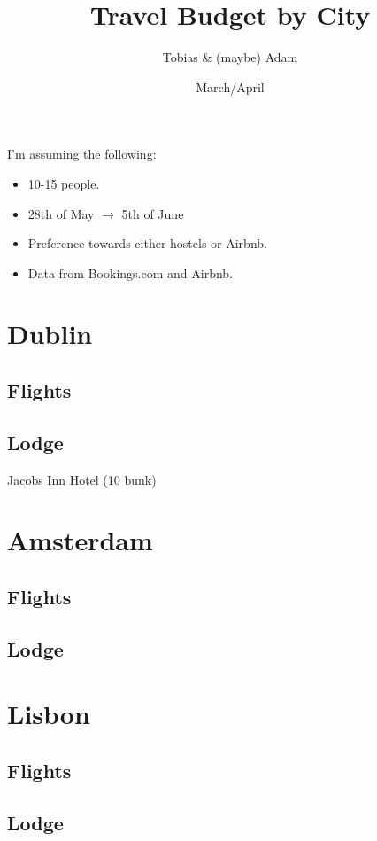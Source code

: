 \documentclass[12pt]{article}
\title{Travel Budget by City}
\author{Tobias \& (maybe) Adam}
\date{March/April}
\begin{document}
	\maketitle
	I'm assuming the following:
	\begin{itemize}
		\item 10-15 people.
		\item 28th of May $\rightarrow$ 5th of June
		\item Preference towards either hostels or Airbnb.
		\item Data from Bookings.com and Airbnb.
	\end{itemize}
	
	\section{Dublin}
	\subsection{Flights}
	
	\subsection{Lodge}
	Jacobs Inn Hotel (10 bunk)
	
	\section{Amsterdam}
	
	\subsection{Flights}
	
	\subsection{Lodge}
	
	\section{Lisbon}
	
	\subsection{Flights}
	
	\subsection{Lodge}
\end{document}
